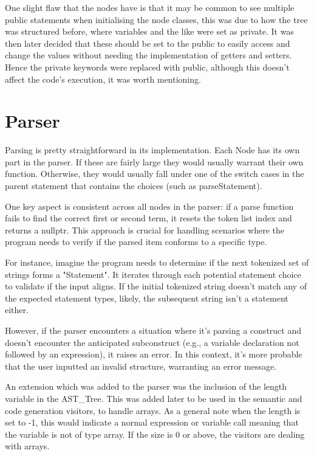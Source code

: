 \documentclass[12pt, a4paper]{report}
\begin{document}
One slight flaw that the nodes have is that it may be common to see multiple public statements when initialising the node classes, this was due to how the tree was structured before, where variables and the like were set as private. It was then later decided that these should be set to the public to easily access and change the values without needing the implementation of getters and setters. Hence the private keywords were replaced with public, although this doesn't affect the code's execution, it was worth mentioning.

\section{Parser}
Parsing is pretty straightforward in its implementation. Each Node has its own part in the parser. If these are fairly large they would usually warrant their own function. Otherwise, they would usually fall under one of the switch cases in the parent statement that contains the choices (such as parseStatement).

One key aspect is consistent across all nodes in the parser: if a parse function fails to find the correct first or second term, it resets the token list index and returns a nullptr. This approach is crucial for handling scenarios where the program needs to verify if the parsed item conforms to a specific type.

For instance, imagine the program needs to determine if the next tokenized set of strings forms a "Statement". It iterates through each potential statement choice to validate if the input aligns. If the initial tokenized string doesn't match any of the expected statement types, likely, the subsequent string isn't a statement either.

However, if the parser encounters a situation where it's parsing a construct and doesn't encounter the anticipated subconstruct (e.g., a variable declaration not followed by an expression), it raises an error. In this context, it's more probable that the user inputted an invalid structure, warranting an error message.

An extension which was added to the parser was the inclusion of the length variable in the AST\_Tree. This was added later to be used in the semantic and code generation visitors, to handle arrays. As a general note when the length is set to -1, this would indicate a normal expression or variable call meaning that the variable is not of type array. If the size is 0 or above, the visitors are dealing with arrays.
\end{document}

